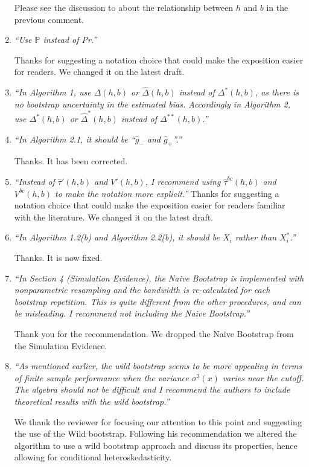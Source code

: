\documentclass[12pt,fleqn]{article}
\begin{document}
\begin{enumerate}
Please see the discussion to about the relationship between $h$ and $b$ in the previous comment.

\item \textit{``Use $\mathbb{P}$ instead of Pr.''}

Thanks for suggesting a notation choice that could make the exposition easier for readers. We changed it on the latest draft.

\item \textit{``In Algorithm 1, use $\Delta(h,b)$ or $\hat{\Delta}(h,b)$ instead of $\Delta^{*}(h,b)$, as there is no bootstrap uncertainty in the estimated bias. Accordingly in Algorithm 2, use $\Delta^{*}(h,b)$ or $\hat{\Delta}^{*}(h,b)$ instead of $\Delta^{**}(h,b)$.''}


\item \textit{``In Algorithm 2.1, it should be ``$\hat{g}_{-}$ and $\hat{g}_{+}$''.''}
 
 Thanks. It has been corrected.

\item \textit{``Instead of $\hat{\tau}'(h,b)$ and $V'(h,b)$, I recommend using $\hat{\tau}^{bc}(h,b)$ and $V^{bc}(h,b)$ to make the notation more explicit.''}
Thanks for suggesting a notation choice that could make the exposition easier for readers familiar with the literature.  We changed it on the latest draft.

\item \textit{``In Algorithm 1.2(b) and Algorithm 2.2(b), it should be $X_{i}$ rather than $X^{*}_{i}$.''}
 
Thanks. It is now fixed.

\item \textit{``In Section 4 (Simulation Evidence), the Naive Bootstrap is implemented with nonparametric resampling and the bandwidth is re-calculated for each bootstrap repetition.
This is quite different from the other procedures, and can be misleading. I recommend not including the Naive Bootstrap.''}

Thank you for the recommendation. We dropped the Naive Bootstrap from the Simulation Evidence.

\item \textit{``As mentioned earlier, the wild bootstrap seems to be more appealing in terms of finite sample performance when the variance $\sigma^{2}(x)$ varies near the cutoff. The algebra should not be difficult and I recommend the authors to include theoretical results with the wild bootstrap.''}

 We thank the reviewer for focusing our attention to this point and suggesting the use of the Wild bootstrap. Following his recommendation we altered the algorithm to use a wild bootstrap approach and discuss its properties, hence allowing for conditional heteroskedasticity.


\end{enumerate}
\end{document}
